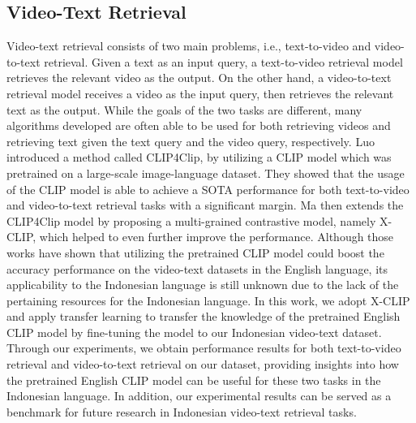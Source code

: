\documentclass{article}
\begin{document}
\subsection{Video-Text Retrieval}
Video-text retrieval consists of two main problems, i.e., text-to-video and video-to-text retrieval. Given a text as an input query, a text-to-video retrieval model retrieves the relevant video as the output. On the other hand, a video-to-text retrieval model receives a video as the input query, then retrieves the relevant text as the output. While the goals of the two tasks are different, many algorithms developed are often able to be used for both retrieving videos and retrieving text given the text query and the video query, respectively. Luo \etal \cite{10.1145/3474085.3479207} introduced a method called CLIP4Clip, by utilizing a CLIP model \cite{Radford2021LearningTV} which was pretrained on a large-scale image-language dataset. They showed that the usage of the CLIP model is able to achieve a SOTA performance for both text-to-video and video-to-text retrieval tasks with a significant margin. Ma \etal \cite{10.1145/3503161.3547910} then extends the CLIP4Clip model by proposing a multi-grained contrastive model, namely X-CLIP, which helped to even further improve the performance. Although those works have shown that utilizing the pretrained CLIP model could boost the accuracy performance on the video-text datasets in the English language, its applicability to the Indonesian language is still unknown due to the lack of the pertaining resources for the Indonesian language. In this work, we adopt X-CLIP and apply transfer learning to transfer the knowledge of the pretrained English CLIP model by fine-tuning the model to our Indonesian video-text dataset. Through our experiments, we obtain performance results for both text-to-video retrieval and video-to-text retrieval on our dataset, providing insights into how the pretrained English CLIP model can be useful for these two tasks in the Indonesian language. In addition, our experimental results can be served as a benchmark for future research in Indonesian video-text retrieval tasks.
\end{document}
